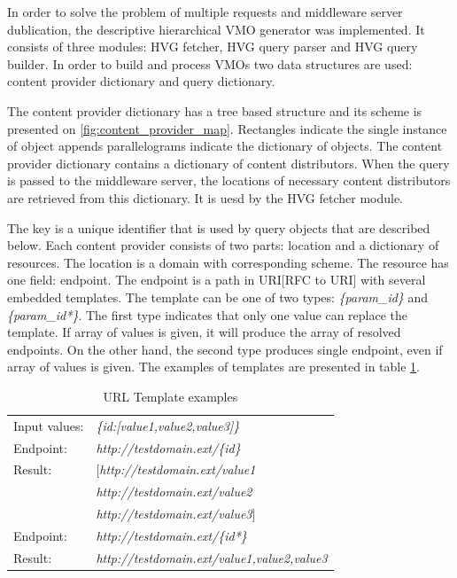 In order to solve the problem of multiple requests and middleware server dublication, the descriptive hierarchical VMO generator was implemented. It consists of three modules: HVG fetcher, HVG query parser and HVG query builder. In order to build and process VMOs two data structures are used: content provider dictionary and query dictionary. 

The content provider dictionary has a tree based structure and its scheme is presented on \ref{fig:content_provider_map}. Rectangles indicate the single instance of object appends parallelograms indicate the dictionary of objects. The content provider dictionary contains a dictionary of content distributors. When the query is passed to the middleware server, the locations of necessary content distributors are retrieved from this dictionary. It is uesd by the HVG fetcher module.

The key is a unique identifier that is used by query objects that are described below. Each content provider consists of two parts: location and a dictionary of resources. The location is a domain with corresponding scheme. The resource has one field: endpoint. The endpoint is a path in URI[RFC to URI] with several embedded templates. The template can be
one of two types: \textit{\{param\_id\}} and \textit{\{param\_id*\}}. The first type indicates that only one value can replace the template. If array of values is given, it will produce the array of resolved endpoints. On the other hand, the second type produces single endpoint, even if array of values is given. The examples of templates are presented in table \ref{table:template_replacement}.


\begin{table}
	 \begin{center}
	  \begin{tabular}{l l}
	    Input values: & \textit{\{id:[value1,value2,value3]\}} \\
	    Endpoint: & \textit{http://testdomain.ext/\{id\}}  \\ 
	    Result: & [\textit{http://testdomain.ext/value1}   \\
	    		&  \textit{http://testdomain.ext/value2}   \\
	    		&  \textit{http://testdomain.ext/value3}]  \\
	    Endpoint: & \textit{http://testdomain.ext/\{id*\}} \\
	    Result: &  \textit{http://testdomain.ext/value1,value2,value3}
	  \end{tabular}
	 \label{table:template_replacement}
	 \caption{URL Template examples}
	\end{center}
\end{table}

